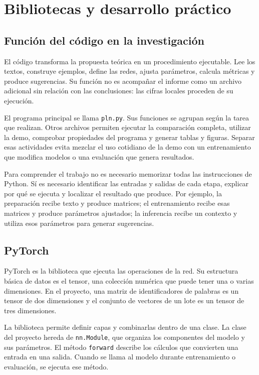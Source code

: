 \section{Bibliotecas y desarrollo práctico}
\subsection{Función del código en la investigación}
El código transforma la propuesta teórica en un procedimiento ejecutable. Lee los textos, construye ejemplos, define las redes, ajusta parámetros, calcula métricas y produce sugerencias. Su función no es acompañar el informe como un archivo adicional sin relación con las conclusiones: las cifras locales proceden de su ejecución.

El programa principal se llama \texttt{pln.py}. Sus funciones se agrupan según la tarea que realizan. Otros archivos permiten ejecutar la comparación completa, utilizar la demo, comprobar propiedades del programa y generar tablas y figuras. Separar esas actividades evita mezclar el uso cotidiano de la demo con un entrenamiento que modifica modelos o una evaluación que genera resultados.

Para comprender el trabajo no es necesario memorizar todas las instrucciones de Python. Sí es necesario identificar las entradas y salidas de cada etapa, explicar por qué se ejecuta y localizar el resultado que produce. Por ejemplo, la preparación recibe texto y produce matrices; el entrenamiento recibe esas matrices y produce parámetros ajustados; la inferencia recibe un contexto y utiliza esos parámetros para generar sugerencias.

\subsection{PyTorch}
PyTorch es la biblioteca que ejecuta las operaciones de la red. Su estructura básica de datos es el tensor, una colección numérica que puede tener una o varias dimensiones. En el proyecto, una matriz de identificadores de palabras es un tensor de dos dimensiones y el conjunto de vectores de un lote es un tensor de tres dimensiones.

La biblioteca permite definir capas y combinarlas dentro de una clase. La clase del proyecto hereda de \texttt{nn.Module}, que organiza los componentes del modelo y sus parámetros. El método \texttt{forward} describe los cálculos que convierten una entrada en una salida. Cuando se llama al modelo durante entrenamiento o evaluación, se ejecuta ese método.

